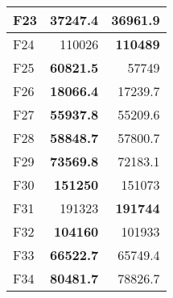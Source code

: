 \begin{table}[]
\begin{tabular}{lrr|}
\multicolumn{1}{|l|}{\cellcolor[HTML]{FCE6AB}F23} & \multicolumn{1}{r|}{\cellcolor[HTML]{D3FFB6}\textbf{37247.4}} & 36961.9                                                   \\ \hline
\multicolumn{1}{|l|}{\cellcolor[HTML]{FCE6AB}F24} & \multicolumn{1}{r|}{110026}                                   & \cellcolor[HTML]{D3FFB6}\textbf{110489}                   \\ \hline
\multicolumn{1}{|l|}{\cellcolor[HTML]{FCE6AB}F25} & \multicolumn{1}{r|}{\cellcolor[HTML]{D3FFB6}\textbf{60821.5}} & 57749                                                     \\ \hline
\multicolumn{1}{|l|}{\cellcolor[HTML]{FCE6AB}F26} & \multicolumn{1}{r|}{\cellcolor[HTML]{D3FFB6}\textbf{18066.4}} & 17239.7                                                   \\ \hline
\multicolumn{1}{|l|}{\cellcolor[HTML]{FCE6AB}F27} & \multicolumn{1}{r|}{\cellcolor[HTML]{D3FFB6}\textbf{55937.8}} & 55209.6                                                   \\ \hline
\multicolumn{1}{|l|}{\cellcolor[HTML]{FCE6AB}F28} & \multicolumn{1}{r|}{\cellcolor[HTML]{D3FFB6}\textbf{58848.7}} & 57800.7                                                   \\ \hline
\multicolumn{1}{|l|}{\cellcolor[HTML]{FCE6AB}F29} & \multicolumn{1}{r|}{\cellcolor[HTML]{D3FFB6}\textbf{73569.8}} & 72183.1                                                   \\ \hline
\multicolumn{1}{|l|}{\cellcolor[HTML]{FCE6AB}F30} & \multicolumn{1}{r|}{\cellcolor[HTML]{D3FFB6}\textbf{151250}}  & 151073                                                    \\ \hline
\multicolumn{1}{|l|}{\cellcolor[HTML]{FCE6AB}F31} & \multicolumn{1}{r|}{191323}                                   & \cellcolor[HTML]{D3FFB6}\textbf{191744}                   \\ \hline
\multicolumn{1}{|l|}{\cellcolor[HTML]{FCE6AB}F32} & \multicolumn{1}{r|}{\cellcolor[HTML]{D3FFB6}\textbf{104160}}  & 101933                                                    \\ \hline
\multicolumn{1}{|l|}{\cellcolor[HTML]{FCE6AB}F33} & \multicolumn{1}{r|}{\cellcolor[HTML]{D3FFB6}\textbf{66522.7}} & 65749.4                                                   \\ \hline
\multicolumn{1}{|l|}{\cellcolor[HTML]{FCE6AB}F34} & \multicolumn{1}{r|}{\cellcolor[HTML]{D3FFB6}\textbf{80481.7}} & 78826.7                                                   \\ \hline

\end{tabular}
\end{table}
